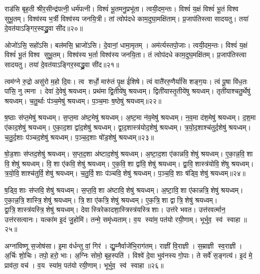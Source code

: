    राड॑सि बृह॒ती श्रीर॒सीन्द्र॑पत्नी॒ धर्म॑पत्नी।
   विश्वं॑ भू॒तमनु॒प्रभू॑ता।
   त्वयी॒दम॒न्तः।
   विश्वं॑ य॒क्षं विश्वं॑ भू॒तं विश्व सुभू॒तम्।
   विश्व॑स्य भ॒र्त्री विश्व॑स्य जनयि॒त्री।
   तां त्वोप॑दधे काम॒दुघा॒मक्षि॑ताम्।
   प्र॒जाप॑तिस्त्वा सादयतु।
   तया॑ दे॒वत॑याऽङ्गिर॒स्वद्ध्रु॒वा सी॑द॥२०॥

   ओजो॑ऽसि॒ सहो॑ऽसि।
   बल॑मसि॒ भ्राजो॑ऽसि।
   दे॒वानां॒ धामा॒मृतम्।
   अम॑र्त्यस्तपो॒जाः।
   त्वयी॒दम॒न्तः।
   विश्वं॑ य॒क्षं विश्वं॑ भू॒तं विश्व सुभू॒तम्।
   विश्व॑स्य भ॒र्ता विश्व॑स्य जनयि॒ता।
   तं त्वोप॑दधे काम॒दुघ॒मक्षि॑तम्।
   प्र॒जाप॑तिस्त्वा सादयतु।
   तया॑ दे॒वत॑याऽङ्गिर॒स्वद्ध्रु॒वा सी॑द॥२१॥
\anuvakamend

   त्वम॑ग्ने रु॒द्रो असु॑रो म॒हो दि॒वः।
   त्व शर्धो॒ मारु॑तं पृ॒क्ष ई॑शिषे।
   त्वं वातै॑ररु॒णैर्या॑सि शङ्ग॒यः।
   त्वं पू॒षा वि॑ध॒तः पा॑सि॒ नु त्मना।
   देवा॑ दे॒वेषु॑ श्रयध्वम्।
   प्रथ॑मा द्वि॒तीये॑षु श्रयध्वम्।
   द्विती॑यास्तृ॒तीये॑षु श्रयध्वम्।
   तृती॑याश्चतु॒र्थेषु॑ श्रयध्वम्।
   च॒तु॒र्थाः प॑ञ्च॒मेषु॑ श्रयध्वम्।
   प॒ञ्च॒माः ष॒ष्ठेषु॑ श्रयध्वम्॥२२॥

   ष॒ष्ठाः स॑प्त॒मेषु॑ श्रयध्वम्।
   स॒प्त॒मा अ॑ष्ट॒मेषु॑ श्रयध्वम्।
   अ॒ष्ट॒मा न॑व॒मेषु॑ श्रयध्वम्।
   न॒व॒मा द॑श॒मेषु॑ श्रयध्वम्।
   द॒श॒मा ए॑काद॒शेषु॑ श्रयध्वम्।
   ए॒का॒द॒शा द्वा॑द॒शेषु॑ श्रयध्वम्।
   द्वा॒द॒शास्त्र॑योद॒शेषु॑ श्रयध्वम्।
   त्र॒यो॒द॒शाश्च॑तुर्द॒शेषु॑ श्रयध्वम्।
   च॒तु॒र्द॒शाः प॑ञ्चद॒शेषु॑ श्रयध्वम्।
   प॒ञ्च॒द॒शाः षो॑ड॒शेषु॑ श्रयध्वम्॥२३॥

   षो॒ड॒शाः स॑प्तद॒शेषु॑ श्रयध्वम्।
   स॒प्त॒द॒शा अ॑ष्टाद॒शेषु॑ श्रयध्वम्।
   अ॒ष्टा॒द॒शा ए॑कान्नवि॒शेषु॑ श्रयध्वम्।
   ए॒का॒न्न॒वि॒शा वि॒शेषु॑ श्रयध्वम्।
   वि॒शा ए॑कवि॒शेषु॑ श्रयध्वम्।
   ए॒क॒वि॒शा द्वा॑वि॒शेषु॑ श्रयध्वम्।
   द्वा॒वि॒शास्त्र॑योवि॒शे॑षु श्रयध्वम्।
   त्र॒यो॒वि॒शाश्च॑तुर्वि॒शेषु॑ श्रयध्वम्।
   च॒तु॒र्वि॒शाः प॑ञ्चवि॒शेषु॑ श्रयध्वम्।
   प॒ञ्च॒वि॒शाः ष॑ड्वि॒शेषु॑ श्रयध्वम्॥२४॥

   ष॒ड्वि॒शाः स॑प्तवि॒शेषु॑ श्रयध्वम्।
   स॒प्त॒वि॒शा अ॑ष्टावि॒शेषु॑ श्रयध्वम्।
   अ॒ष्टा॒वि॒शा ए॑कान्नत्रि॒शेषु॑ श्रयध्वम्।
   ए॒का॒न्न॒त्रि॒शास्त्रि॒शेषु॑ श्रयध्वम्।
   त्रि॒शा ए॑कत्रि॒शेषु॑ श्रयध्वम्।
   ए॒क॒त्रि॒शा द्वात्रि॒शेषु॑ श्रयध्वम्।
   द्वा॒त्रि॒शास्त्र॑यस्त्रि॒\-शेषु॑ श्रयध्वम्।
   देवास्त्रिरेकादशा॒स्त्रिस्त्र॑य\-स्त्रिशाः।
   उत्त॑रे भवत।
   उत्त॑रवर्त्मान॒ उत्त॑रसत्वानः।
   यत्का॑म इ॒दं जु॒होमि॑।
   तन्मे॒ समृ॑ध्यताम्।
   व॒य स्या॑म॒ पत॑यो रयी॒णाम्।
   भूर्भुव॒ स्व॑ स्वाहा॥२५॥
   \anuvakamend
   
   अग्ना॑विष्णू स॒जोष॑सा।
   इ॒मा व॑र्धन्तु वां॒ गिर॑।
   द्यु॒म्नैर्वाजे॑भि॒राग॑तम्।
   राज्ञी॑ वि॒राज्ञी।
   स॒म्राज्ञी स्व॒राज्ञी।
   अ॒र्चिः शो॒चिः।
   तपो॒ हरो॒ भाः।
   अ॒ग्निः सोमो॒ बृह॒स्पति॑।
   विश्वे॑ दे॒वा भुव॑नस्य गो॒पाः।
   ते सर्वे॑ स॒ङ्गत्य॑।
   इ॒दं मे॒ प्राव॑ता॒ वच॑।
   व॒य स्या॑म॒ पत॑यो रयी॒णाम्।
   भूर्भुव॒ स्व॑ स्वाहा॥२६॥
   \anuvakamend
   
